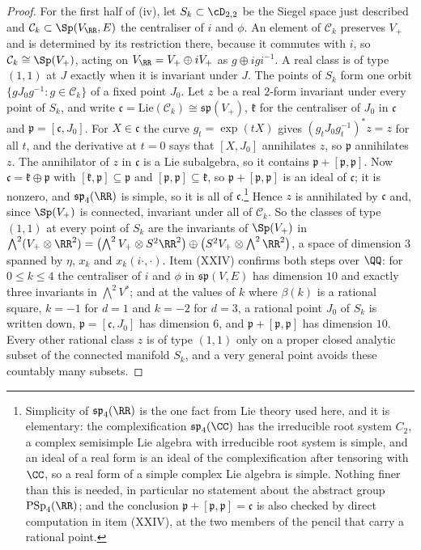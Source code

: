 \begin{proof}
For the first half of (iv), let $S_{k}\subset\cD_{2,2}$ be the Siegel space
just described and $\mathcal{C}_{k}\subset\Sp(V_{\RR},E)$ the centraliser of
$i$ and $\phi$. An element of $\mathcal{C}_{k}$ preserves $V_{+}$ and is
determined by its restriction there, because it commutes with $i$, so
$\mathcal{C}_{k}\cong\Sp(V_{+})$, acting on $V_{\RR}=V_{+}\oplus iV_{+}$ as
$g\oplus igi^{-1}$. A real class is of type $(1,1)$ at $J$ exactly when it is
invariant under $J$. The points of $S_{k}$ form one orbit
$\{gJ_{0}g^{-1}:g\in\mathcal{C}_{k}\}$ of a fixed point $J_{0}$. Let $z$ be a
real $2$-form invariant under every point of $S_{k}$, and write
$\mathfrak{c}=\mathrm{Lie}(\mathcal{C}_{k})\cong\mathfrak{sp}(V_{+})$,
$\mathfrak{k}$ for the centraliser of $J_{0}$ in $\mathfrak{c}$ and
$\mathfrak{p}=[\mathfrak{c},J_{0}]$. For $X\in\mathfrak{c}$ the curve
$g_{t}=\exp(tX)$ gives $(g_{t}J_{0}g_{t}^{-1})^{*}z=z$ for all $t$, and the
derivative at $t=0$ says that $[X,J_{0}]$ annihilates $z$, so $\mathfrak{p}$
annihilates $z$. The annihilator of $z$ in $\mathfrak{c}$ is a Lie
subalgebra, so it contains $\mathfrak{p}+[\mathfrak{p},\mathfrak{p}]$. Now
$\mathfrak{c}=\mathfrak{k}\oplus\mathfrak{p}$ with
$[\mathfrak{k},\mathfrak{p}]\subseteq\mathfrak{p}$ and
$[\mathfrak{p},\mathfrak{p}]\subseteq\mathfrak{k}$, so
$\mathfrak{p}+[\mathfrak{p},\mathfrak{p}]$ is an ideal of $\mathfrak{c}$;
it is nonzero, and $\mathfrak{sp}_{4}(\RR)$ is simple, so it is all of
$\mathfrak{c}$.\footnote{Simplicity of $\mathfrak{sp}_{4}(\RR)$ is the one
fact from Lie theory used here, and it is elementary: the complexification
$\mathfrak{sp}_{4}(\CC)$ has the irreducible root system $C_{2}$, a complex
semisimple Lie algebra with irreducible root system is simple, and an ideal of a
real form is an ideal of the complexification after tensoring with $\CC$, so
a real form of a simple complex Lie algebra is simple. Nothing finer than this
is needed, in particular no statement about the abstract group
$\mathrm{PSp}_{4}(\RR)$; and the conclusion
$\mathfrak{p}+[\mathfrak{p},\mathfrak{p}]=\mathfrak{c}$ is also checked by
direct computation in item (XXIV), at the two members of the pencil that carry
a rational point.} Hence $z$ is annihilated by $\mathfrak{c}$ and, since
$\Sp(V_{+})$ is connected, invariant under all of $\mathcal{C}_{k}$.
So the classes of type $(1,1)$ at every point of $S_{k}$ are the invariants of
$\Sp(V_{+})$ in $\bigwedge^{2}(V_{+}\otimes\RR^{2})
=\bigl(\bigwedge^{2}V_{+}\otimes S^{2}\RR^{2}\bigr)
\oplus\bigl(S^{2}V_{+}\otimes\bigwedge^{2}\RR^{2}\bigr)$, a space of dimension
$3$ spanned by $\eta$, $x_{k}$ and $x_{k}(i\cdot,\cdot)$. Item (XXIV)
confirms both steps over $\QQ$: for $0\le k\le4$ the centraliser of $i$ and
$\phi$ in $\mathfrak{sp}(V,E)$ has dimension $10$ and exactly three invariants
in $\bigwedge^{2}V^{*}$; and at the values of $k$ where $\beta(k)$ is a
rational square, $k=-1$ for $d=1$ and $k=-2$ for $d=3$, a rational point
$J_{0}$ of $S_{k}$ is written down, $\mathfrak{p}=[\mathfrak{c},J_{0}]$ has
dimension $6$, and $\mathfrak{p}+[\mathfrak{p},\mathfrak{p}]$ has dimension
$10$. Every other rational class $z$ is of type $(1,1)$ only on
a proper closed analytic subset of the connected manifold $S_{k}$, and a very
general point avoids these countably many subsets.


\end{proof}
